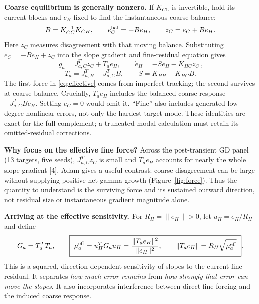 \documentclass[10pt]{article}
\begin{document}
\textbf{Coarse equilibrium is generally nonzero.}
If $K_{CC}$ is invertible, hold its current blocks and $e_H$ fixed to find
the instantaneous coarse balance:
\begin{equation}\label{eq:balance}
 B=K_{CC}^{-1}K_{CH},\qquad
 e_C^{\rm bal}=-Be_H,\qquad z_C=e_C+Be_H.
\end{equation}
Here $z_C$ measures disagreement with that moving balance. Substituting
$e_C=-Be_H+z_C$ into the slope gradient and fine-residual equation gives
\begin{equation}\label{eq:effective}
 \boxed{\ g_a=J_{a,C}^Tz_C+T_ae_H,\qquad
          \dot e_H=-Se_H-K_{HC}z_C\ },
\end{equation}
\begin{equation}\label{eq:maps}
 T_a=J_{a,H}^T-J_{a,C}^TB,\qquad
 S=K_{HH}-K_{HC}B.
\end{equation}
The first force in \eqref{eq:effective} comes from imperfect tracking;
the second survives at coarse balance. Crucially, $T_ae_H$ includes the
balanced coarse response $-J_{a,C}^TBe_H$. Setting $e_C=0$ would omit it.
``Fine'' also includes generated low-degree nonlinear errors, not only the
hardest target mode. These identities are exact for the full complement;
a truncated modal calculation must retain its omitted-residual corrections.

\textbf{Why focus on the effective fine force?}
Across the post-transient GD panel (13 targets, five seeds), $J_{a,C}^Tz_C$
is small and $T_ae_H$ accounts for nearly the whole slope gradient [4]. Adam gives a useful
contrast: coarse disagreement can be large without supplying positive net
gamma growth (Figure~\ref{fig:force}). Thus the quantity to understand is
the surviving force and its sustained outward direction, not residual size
or instantaneous gradient magnitude alone.

\textbf{Arriving at the effective sensitivity.}
For $R_H=\|e_H\|>0$, let $u_H=e_H/R_H$ and define
\begin{equation}\label{eq:sensitivity}
 G_a=T_a^TT_a,\qquad
 \boxed{\ \mu_a^{\rm eff}=u_H^TG_au_H
       =\frac{\|T_ae_H\|^2}{\|e_H\|^2},\qquad
       \|T_ae_H\|=R_H\sqrt{\mu_a^{\rm eff}}\ }.
\end{equation}
This is a squared, direction-dependent sensitivity of slopes to the current
fine residual. It separates \emph{how much error remains} from \emph{how
strongly that error can move the slopes}. It also incorporates interference
between direct fine forcing and the induced coarse response.
\end{document}
